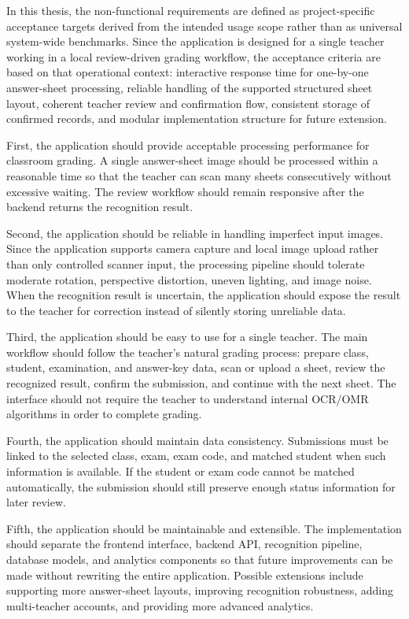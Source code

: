 \documentclass[../Main.tex]{subfiles}
\begin{document}
In this thesis, the non-functional requirements are defined as project-specific
acceptance targets derived from the intended usage scope rather than as
universal system-wide benchmarks. Since the application is designed for a
single teacher working in a local review-driven grading workflow, the
acceptance criteria are based on that operational context: interactive response
time for one-by-one answer-sheet processing, reliable handling of the supported
structured sheet layout, coherent teacher review and confirmation flow,
consistent storage of confirmed records, and modular implementation structure
for future extension.

First, the application should provide acceptable processing performance for classroom
grading. A single answer-sheet image should be processed within a reasonable time
so that the teacher can scan many sheets consecutively without excessive waiting.
The review workflow should remain responsive after the backend returns the
recognition result.

Second, the application should be reliable in handling imperfect input images. Since
the application supports camera capture and local image upload rather than only
controlled scanner input, the processing pipeline should tolerate moderate
rotation, perspective distortion, uneven lighting, and image noise. When the
recognition result is uncertain, the application should expose the result to the
teacher for correction instead of silently storing unreliable data.

Third, the application should be easy to use for a single teacher. The main workflow
should follow the teacher's natural grading process: prepare class, student,
examination, and answer-key data,
scan or upload a sheet, review the recognized result, confirm the submission, and
continue with the next sheet. The interface should not require the teacher to
understand internal OCR/OMR algorithms in order to complete grading.

Fourth, the application should maintain data consistency. Submissions must be linked
to the selected class, exam, exam code, and matched student when such information
is available. If the student or exam code cannot be matched automatically, the
submission should still preserve enough status information for later review.

Fifth, the application should be maintainable and extensible. The implementation
should separate the frontend interface, backend API, recognition pipeline,
database models, and analytics components so that future improvements can be made
without rewriting the entire application. Possible extensions include supporting more
answer-sheet layouts, improving recognition robustness, adding multi-teacher
accounts, and providing more advanced analytics.
\end{document}
